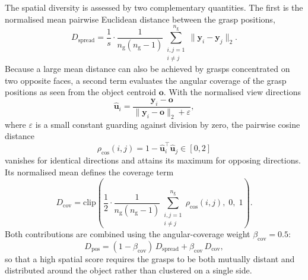 \begin{enumerate}
The spatial diversity is assessed by two complementary quantities. The first is the normalised mean
pairwise Euclidean distance between the grasp positions,
\begin{equation}
    D_{\mathrm{spread}} =
    \frac{1}{s} \cdot
    \frac{1}{n_{\mathrm{g}}(n_{\mathrm{g}}-1)}
    \sum_{\substack{i,j=1 \\ i \neq j}}^{n_{\mathrm{g}}}
    \|\mathbf{y}_i - \mathbf{y}_j\|_2 .
\end{equation}
Because a large mean distance can also be achieved by grasps concentrated on two opposite faces, a
second term evaluates the angular coverage of the grasp positions as seen from the object centroid
$\mathbf{o}$. With the normalised view directions
\begin{equation}
    \hat{\mathbf{u}}_i =
    \frac{\mathbf{y}_i - \mathbf{o}}{\|\mathbf{y}_i - \mathbf{o}\|_2 + \varepsilon},
\end{equation}
where $\varepsilon$ is a small constant guarding against division by zero, the pairwise cosine
distance
\begin{equation}
    \rho_{\cos}(i,j) = 1 - \hat{\mathbf{u}}_i^\top \hat{\mathbf{u}}_j \in [0,2]
\end{equation}
vanishes for identical directions and attains its maximum for opposing directions. Its normalised
mean defines the coverage term
\begin{equation}
    D_{\mathrm{cov}} =
    \mathrm{clip}\!\left(
        \frac{1}{2} \cdot
        \frac{1}{n_{\mathrm{g}}(n_{\mathrm{g}}-1)}
        \sum_{\substack{i,j=1 \\ i \neq j}}^{n_{\mathrm{g}}}
        \rho_{\cos}(i,j),
        \; 0, \; 1
    \right).
\end{equation}
Both contributions are combined using the angular-coverage weight $\beta_{\mathrm{cov}} = 0.5$:
\begin{equation}
    D_{\mathrm{pos}} =
    (1-\beta_{\mathrm{cov}})\,D_{\mathrm{spread}}
    +
    \beta_{\mathrm{cov}}\,D_{\mathrm{cov}},
\end{equation}
so that a high spatial score requires the grasps to be both mutually distant and distributed around
the object rather than clustered on a single side.


\end{enumerate}
